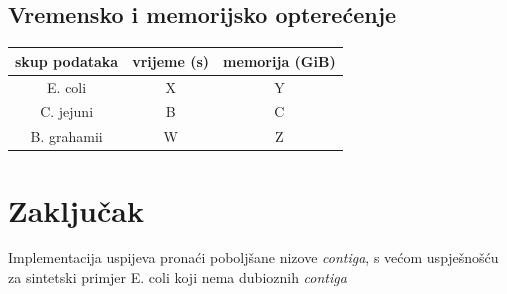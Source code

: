 \documentclass[times, utf8, seminar, numeric]{fer}
\begin{document}
\section{Vremensko i memorijsko opterećenje}

\begin{center}
\begin{tabular}[h]{|c||c|c|}
	\hline
	skup podataka & vrijeme (s) & memorija (GiB)\\
	\hline
	\hline
	E. coli & X & Y \\
	\hline
	C. jejuni & B & C \\
	\hline
	B. grahamii & W & Z \\
	\hline
\end{tabular}
\end{center}

\chapter{Zaključak}
Implementacija uspijeva pronaći poboljšane nizove \textit{contiga}, s većom uspješnošću za sintetski primjer E. coli koji nema dubioznih \textit{contiga} 



\end{document}
